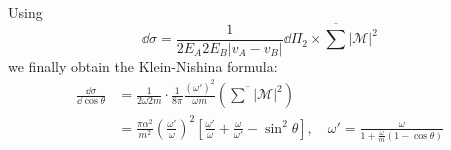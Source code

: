 Using 
\[
\dd\sigma =\frac{1}{2E_A 2E_B|v_A-v_B|}\dd \Pi_2 \times \overline{\sum}|\mathcal M|^2
\]
we finally obtain the Klein-Nishina formula:
\begin{equation}\begin{aligned}
\frac{\dd \sigma}{\dd \cos\theta} &= \frac{1}{2\omega 2m}\cdot \frac{1}{8\pi} \frac{(\omega')^2}{\omega m }
\left(\overline{\sum}|\mathcal M|^2\right)\\
&=\frac{\pi \alpha^2}{m^2}\left(\frac{\omega'}{\omega}\right)^2\left[\frac{\omega'}{\omega}+\frac{\omega}{\omega'}-\sin^2\theta\right],\quad \omega'=\frac{\omega}{1+\frac{\omega}{m}(1-\cos\theta)}
\end{aligned}\end{equation}